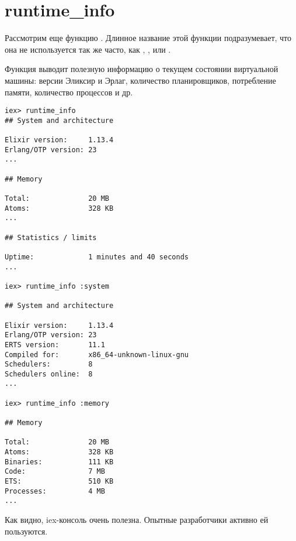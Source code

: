 \section{runtime\_info}

Рассмотрим еще функцию . Длинное название этой функции подразумевает, что она не используется так же часто, как , ,  или .

Функция выводит полезную информацию о текущем состоянии виртуальной машины: версии Эликсир и Эрлаг, количество планировщиков, потребление памяти, количество процессов и др.

\begin{lstlisting}[language=ElixirShell, style=elixir-shell]
iex> runtime_info
## System and architecture

Elixir version:     1.13.4
Erlang/OTP version: 23
...

## Memory

Total:              20 MB
Atoms:              328 KB
...

## Statistics / limits

Uptime:             1 minutes and 40 seconds
...

iex> runtime_info :system

## System and architecture

Elixir version:     1.13.4
Erlang/OTP version: 23
ERTS version:       11.1
Compiled for:       x86_64-unknown-linux-gnu
Schedulers:         8
Schedulers online:  8
...

iex> runtime_info :memory

## Memory

Total:              20 MB
Atoms:              328 KB
Binaries:           111 KB
Code:               7 MB
ETS:                510 KB
Processes:          4 MB
...
\end{lstlisting}

Как видно, iex-консоль очень полезна. Опытные разработчики активно ей пользуются.
